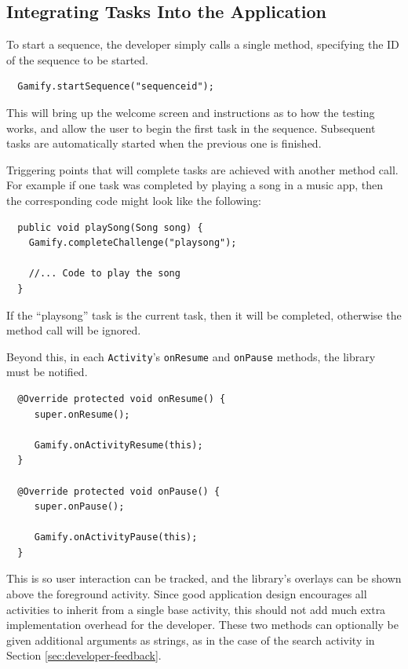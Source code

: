 \subsection{Integrating Tasks Into the Application}

To start a sequence, the developer simply calls a single method,
specifying the ID of the sequence to be started.

\begin{verbatim}
  Gamify.startSequence("sequenceid");
\end{verbatim}

This will bring up the welcome screen and instructions as to how
the testing works, and allow the user to begin the first task in
the sequence. Subsequent tasks are automatically started when the
previous one is finished.

Triggering points that will complete tasks are achieved with another
method call. For example if one task was completed by playing a
song in a music app, then the corresponding code might look like
the following:

\begin{verbatim}
  public void playSong(Song song) {
    Gamify.completeChallenge("playsong");

    //... Code to play the song
  }
\end{verbatim}

If the ``playsong'' task is the current task, then it will be
completed, otherwise the method call will be ignored.

Beyond this, in each \verb|Activity|'s \verb|onResume| and
\verb|onPause| methods, the library must be notified.

\begin{verbatim}
  @Override protected void onResume() {
     super.onResume();

     Gamify.onActivityResume(this);
  }

  @Override protected void onPause() {
     super.onPause();

     Gamify.onActivityPause(this);
  }
\end{verbatim}

This is so user interaction can be tracked, and the library's
overlays can be shown above the foreground activity. Since good application
design encourages all activities to inherit from a single
base activity, this should not add much extra implementation overhead for the
developer. These two methods can optionally be given additional
arguments as strings, as in the case of the search activity in
Section \ref{sec:developer-feedback}.

